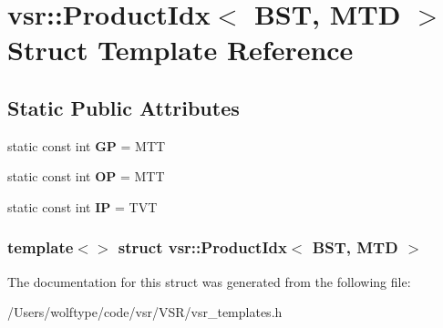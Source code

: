 \hypertarget{structvsr_1_1_product_idx_3_01_b_s_t_00_01_m_t_d_01_4}{\section{vsr\-:\-:Product\-Idx$<$ B\-S\-T, M\-T\-D $>$ Struct Template Reference}
\label{structvsr_1_1_product_idx_3_01_b_s_t_00_01_m_t_d_01_4}
}
\subsection*{Static Public Attributes}
\begin{DoxyCompactItemize}
\item 
\hypertarget{structvsr_1_1_product_idx_3_01_b_s_t_00_01_m_t_d_01_4_ae1139a221beed62a6819a528c43f9b9e}{static const int {\bfseries G\-P} = M\-T\-T}\label{structvsr_1_1_product_idx_3_01_b_s_t_00_01_m_t_d_01_4_ae1139a221beed62a6819a528c43f9b9e}

\item 
\hypertarget{structvsr_1_1_product_idx_3_01_b_s_t_00_01_m_t_d_01_4_a4924373770941d2fd2783921627981d6}{static const int {\bfseries O\-P} = M\-T\-T}\label{structvsr_1_1_product_idx_3_01_b_s_t_00_01_m_t_d_01_4_a4924373770941d2fd2783921627981d6}

\item 
\hypertarget{structvsr_1_1_product_idx_3_01_b_s_t_00_01_m_t_d_01_4_a35ab937abbc48cbb25d0e8d6b09079ab}{static const int {\bfseries I\-P} = T\-V\-T}\label{structvsr_1_1_product_idx_3_01_b_s_t_00_01_m_t_d_01_4_a35ab937abbc48cbb25d0e8d6b09079ab}

\end{DoxyCompactItemize}
\subsubsection*{template$<$$>$ struct vsr\-::\-Product\-Idx$<$ B\-S\-T, M\-T\-D $>$}



The documentation for this struct was generated from the following file\-:\begin{DoxyCompactItemize}
\item 
/\-Users/wolftype/code/vsr/\-V\-S\-R/vsr\-\_\-templates.\-h\end{DoxyCompactItemize}
